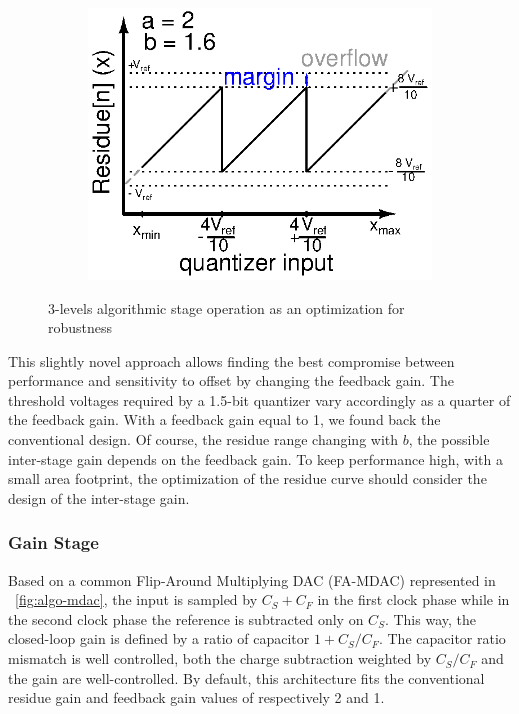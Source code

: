 \begin{figure}[htp]
\begin{subfigure}[b]{0.32\textwidth}
		\label{fig:algo-21}
	\end{subfigure}
	\begin{subfigure}[b]{0.32\textwidth}
		\centering
		\includegraphics[width=\textwidth]{Chapter4/Figs/3-levels-pattern-algo-2-1_6.ps}
		\label{fig:algo-21-6}
	\end{subfigure}
	\caption{3-levels algorithmic stage operation as an optimization for robustness}
	\label{fig:algo-quantizer}
\end{figure}

This slightly novel approach allows finding the best compromise between performance and sensitivity to offset by changing the feedback gain. The threshold voltages required by a 1.5-bit quantizer vary accordingly as a quarter of the feedback gain. With a feedback gain equal to 1, we found back the conventional design. Of course, the residue range changing with $b$, the possible inter-stage gain depends on the feedback gain. To keep performance high, with a small area footprint, the optimization of the residue curve should consider the design of the inter-stage gain.

	\subsubsection{Gain Stage}              %
	\label{sec:algo_gain_stage}
Based on a common Flip-Around Multiplying DAC (FA-MDAC) represented in \figurename~\ref{fig:algo-mdac}, the input is sampled by \(C_S+C_F\) in the first clock phase while in the second clock phase the reference is subtracted only on \(C_S\). This way, the closed-loop gain is defined by a ratio of capacitor \(1+C_S/C_F\). The capacitor ratio mismatch is well controlled, both the charge subtraction weighted by \(C_S/C_F\) and the gain are well-controlled. By default, this architecture fits the conventional residue gain and feedback gain values of respectively 2 and 1.

